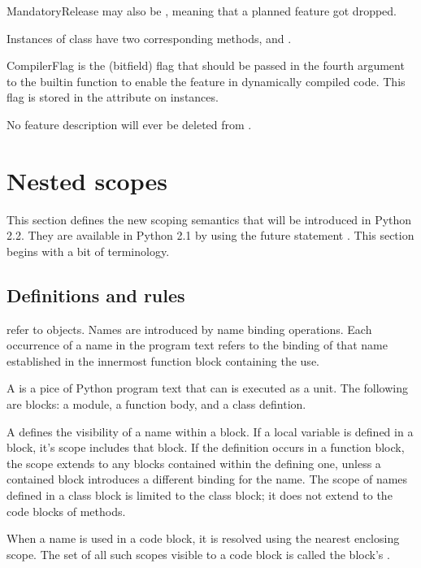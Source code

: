 MandatoryRelease may also be , meaning that a planned
feature got dropped.

Instances of class  have two corresponding methods,
 and .

CompilerFlag is the (bitfield) flag that should be passed in the
fourth argument to the builtin function  to enable
the feature in dynamically compiled code.  This flag is stored in the
 attribute on  instances.

No feature description will ever be deleted from .

\section{Nested scopes \label{nested-scopes}}

This section defines the new scoping semantics that will be introduced
in Python 2.2.  They are available in Python 2.1 by using the future
statement .  This section begins with a bit of
terminology. 

\subsection{Definitions and rules \label{definitions}}

 refer to objects.  Names are introduced by name binding
operations.  Each occurrence of a name in the program text refers to
the binding of that name established in the innermost function block
containing the use.

A  is a pice of Python program text that can is executed as
a unit.  The following are blocks: a module, a function body, and a
class defintion.

A  defines the visibility of a name within a block.  If a
local variable is defined in a block, it's scope includes that block.
If the definition occurs in a function block, the scope extends to any
blocks contained within the defining one, unless a contained block
introduces a different binding for the name.  The scope of names
defined in a class block is limited to the class block; it does not
extend to the code blocks of methods.

When a name is used in a code block, it is resolved using the nearest
enclosing scope.  The set of all such scopes visible to a code block
is called the block's .  

